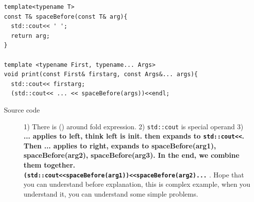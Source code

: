\documentclass[a4paper,11pt,twoside]{book}
\begin{document}
\begin{itemize}
\begin{lstlisting}
template<typename T>
const T& spaceBefore(const T& arg){
  std::cout<< ' ';
  return arg;
}

template <typename First, typename... Args>
void print(const First& firstarg, const Args&... args){
  std::cout<< firstarg;
  (std::cout<< ... << spaceBefore(args))<<endl;
\end{lstlisting}

\begin{description}
    \item[Source code] 1) There is () around fold expression. 2) \texttt{std::cout} is special operand 3) \textbf{... applies to left, think left is init. then expands to \texttt{std::cout<<}. Then ... applies to right, expands to spaceBefore(arg1), spaceBefore(arg2), spaceBefore(arg3). In the end, we combine them together. \\
    	\texttt{(std::cout<<spaceBefore(arg1))<<spaceBefore(arg2)...} }. Hope that you can understand before explanation, this is complex example, when you understand it, you can understand some simple problems. 
\end{description}
\end{itemize}
\end{document}
